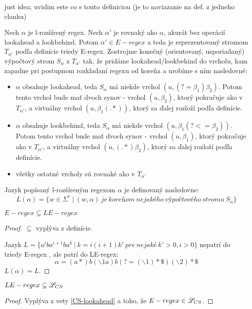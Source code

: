 \todo just idea; uvidim este co s touto definiciou (je to naviazanie na def. z jedneho clanku)
\begin{df}
Nech $\alpha$ je l-rozšírený regex. Nech $\alpha '$ je rovnaký ako $\alpha$, akurát bez operácií lookahead a lookbehind. Potom $\alpha ' \in E-regex$ a teda je reprezentovaný stromom $T_{\alpha '}$ podľa definície triedy E-regex. Zostrojme konečný (orientovaný, usporiadaný) výpočtový strom $S_\alpha$ z $T_{\alpha '}$ tak, že pridáme lookahead/lookbehind do vrcholu, kam zapadne pri postupnom rozkladaní regexu od koreňa a urobíme s ním nasledovné:
\begin{itemize}
  \item  $\alpha$ obsahuje lookahead, teda $S_\alpha$ má niekde vrchol $(u, (?=\beta_1 )\beta_2)$. Potom tento vrchol bude mať dvoch synov - vrchol $(u,\beta_2)$, ktorý pokračuje ako v $T_{\alpha '}$, a virtuálny vrchol $(u,\beta_1 (.*))$, ktorý sa ďalej rozloží podľa definície.
  \item  $\alpha$ obsahuje lookbehind, teda $S_\alpha$ má niekde vrchol $(u, \beta_1(?<=\beta_2))$. Potom tento vrchol bude mať dvoch synov - vrchol $(u,\beta_1)$, ktorý pokračuje ako v $T_{\alpha '}$, a virtuálny vrchol $(u,(.*)\beta_2)$, ktorý sa ďalej rozloží podľa definície.
  \item všetky ostatné vrcholy sú rovnaké ako v $T_{\alpha '}$
\end{itemize}
Jazyk popísaný l-rozšíreným regexom $\alpha$ je definovaný nasledovne: 
$$L(\alpha ) = \lbrace w \in \Sigma ^* ~|~ (w, \alpha)~je~koreňom~nejakého~výpočtového~stromu~S_\alpha \rbrace$$
\end{df}

\begin{veta}
$ E-regex \subsetneq LE-regex $
\end{veta}
\begin{proof}
$ \subseteq $ vyplýva z definície.

Jazyk $L = \lbrace a^iba^{i+1}ba^k ~|~ k=i(i+1)k' ~ pre ~ nejaké ~ k'>0, i>0 \rbrace$ nepatrí do triedy E-regex \cite[Lemma 2]{ExtendedRegexIntersec}, ale patrí do LE-regex:
$$ \alpha = (a*)b(\backslash 1a)b(?=(\backslash 1)* \mathdollar )(\backslash 2)* \mathdollar $$ $ L(\alpha ) = L. $
\end{proof}

\begin{veta}
$ LE-regex \subseteq \mathscr{L}_{CS} $
\end{veta}
\begin{proof}
Vyplýva z vety \ref{CS-lookahead} a toho, že $ E-regex \in \mathscr{L}_{CS} $.
\end{proof}

